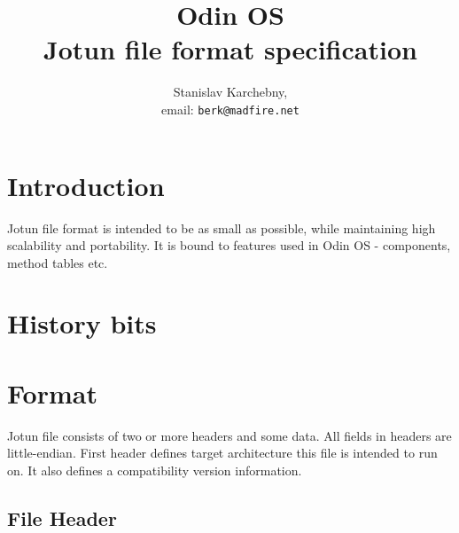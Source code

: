 \documentclass[onecolumn]{article}
\begin{document}
\title{\Large\bf Odin OS \\
                 Jotun file format specification}
\author{Stanislav Karchebny, \\
        email: \texttt{berk@madfire.net}}
\maketitle



\section{Introduction}

\par Jotun file format is intended to be as small as possible, while maintaining
high scalability and portability. It is bound to features used in Odin OS -
components, method tables etc.



\section{History bits}



\section{Format}

\par Jotun file consists of two or more headers and some data.
All fields in headers are little-endian.
First header defines target architecture this file is intended to run on.
It also defines a compatibility version information.


\subsection{File Header}
\label{sec:filehdr}
\end{document}
